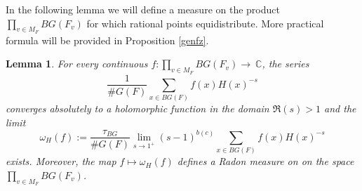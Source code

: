 \documentclass[a4paper,english,12pt]{amsart}
\newcommand{\CC}{\mathbb{C}}
\newcommand{\vMF}{v\in M_F}
\newtheorem{lem}[equation]{Lemma}
\numberwithin{equation}{subsection}
\begin{document}
\subsubsection{}In the following lemma we will define a measure on the product~$\prod_{\vMF}BG(F_v)$ for which rational points equidistribute. More practical formula will be provided in Proposition \ref{genfz}. 
\begin{lem}\label{existmeas}
For every continuous $f:\prod_{\vMF}BG(F_v)\to~\CC$, the series $$\frac{1}{\# G(F)}\sum_{x\in BG(F)}f(x)H(x)^{-s}$$converges absolutely to a holomorphic function in the domain $\Re(s)>1$ and the limit $$\omega_H(f):=\frac{\tau_{BG} }{\# G(F)}\lim_{s\to 1^+}(s-1)^{b(c)}\sum_{x\in BG(F)} f(x)H(x)^{-s}$$exists. Moreover, the map $f\mapsto\omega_H(f)$ defines a Radon measure on on the space $\prod_{\vMF}BG(F_v)$.
\end{lem}
\end{document}
